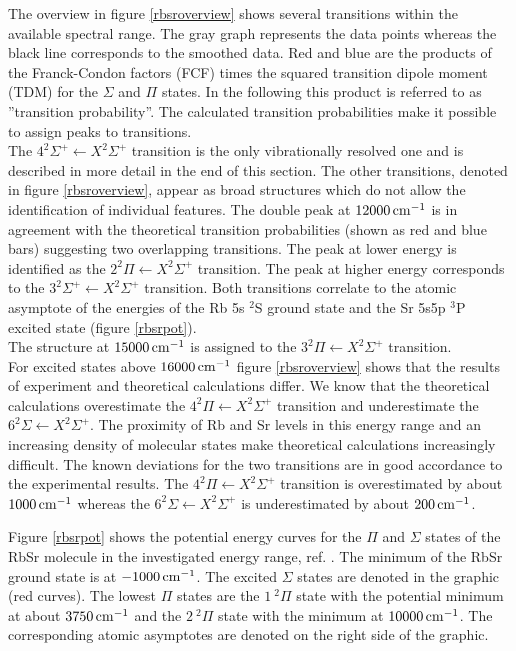 \documentclass[parskip,12pt,headsepline,a4paper] {scrbook}
\begin{document}
The overview in figure \ref{rbsroverview} shows several transitions within the available spectral range. The gray graph represents the data points whereas the black line corresponds to the smoothed data. Red and blue are the products of the Franck-Condon factors (FCF) times the squared transition dipole moment (TDM) for the $\Sigma$ and $\Pi$ states. In the following this product is referred to as ''transition probability''. The calculated transition probabilities make it possible to assign peaks to transitions. \\
The $4 ^2\Sigma^+ \leftarrow X ^2\Sigma^+$ transition is the only vibrationally resolved one and is described in more detail in the end of this section. The other transitions, denoted in figure \ref{rbsroverview}, appear as broad structures which do not allow the identification of individual features. The double peak at $\unit[12000]{cm^{-1}}$ is in agreement with the theoretical transition probabilities (shown as red and blue bars) suggesting two overlapping transitions. The peak at lower energy is identified as the $2 ^2\Pi \leftarrow X ^2\Sigma^+$ transition. The peak at higher energy corresponds to the $3 ^2\Sigma^+ \leftarrow X ^2\Sigma^+$ transition. Both transitions correlate to the atomic asymptote of the energies of the Rb 5s $^2$S ground state and the Sr 5s5p $^3$P excited state (figure \ref{rbsrpot}). \\
The structure at $\unit[15000]{cm^{-1}}$ is assigned to the $3 ^2\Pi \leftarrow X ^2\Sigma^+$ transition. \\
For excited states above $\unit[16000]{cm^{-1}}$ figure \ref{rbsroverview} shows that the results of experiment and theoretical calculations differ. We know that the theoretical calculations overestimate the $4 ^2\Pi \leftarrow X ^2\Sigma^+$ transition and underestimate the $6 ^2\Sigma \leftarrow X ^2\Sigma^+$. The proximity of Rb and Sr levels in this energy range and an increasing density of molecular states make theoretical calculations increasingly difficult. The known deviations for the two transitions are in good accordance to the experimental results. The $4 ^2\Pi \leftarrow X ^2\Sigma^+$ transition is overestimated by about $\unit[1000]{cm^{-1}}$ whereas the $6 ^2\Sigma \leftarrow X ^2\Sigma^+$ is underestimated by about $\unit[200]{cm^{-1}}$.

Figure \ref{rbsrpot} shows the potential energy curves for the $\Pi$ and $\Sigma$ states of the RbSr molecule in the investigated energy range, ref. \cite{krois-doc}. The minimum of the RbSr ground state is at $\unit[-1000]{cm^{-1}}$. The excited $\Sigma$ states are denoted in the graphic (red curves). The lowest $\Pi$ states are the $1 \ ^2\Pi$ state with the potential minimum at about $\unit[3750]{cm^{-1}}$ and the $2 \ ^2\Pi$ state with the minimum at $\unit[10000]{cm^{-1}}$. The corresponding atomic asymptotes are denoted on the right side of the graphic.
\end{document}
